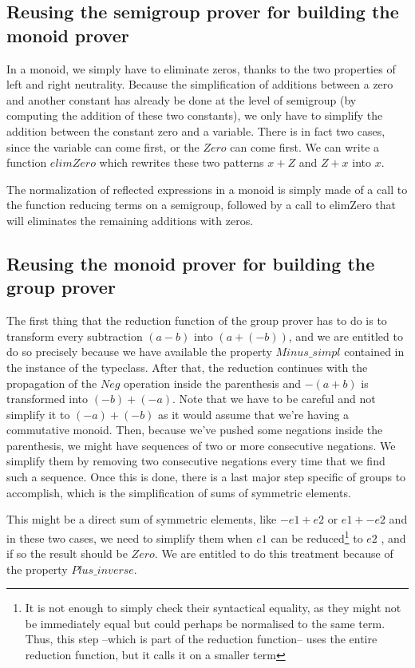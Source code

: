 \subsection {Reusing the semigroup prover for building the monoid prover}

In a monoid, we simply have to eliminate zeros, thanks to the two properties of left and right neutrality. Because the simplification of additions between a zero and another constant has already be done at the level of semigroup (by computing the addition of these two constants), we only have to simplify the addition between the constant zero and a variable. There is in fact two cases, since the variable can come first, or the $Zero$ can come first. We can write a function $elimZero$ which rewrites these two patterns $x+Z$ and $Z+x$ into $x$.


The normalization of reflected expressions in a monoid is simply made of a call to the function reducing terms on a semigroup, followed by a call to elimZero that will eliminates the remaining additions with zeros. 

\subsection {Reusing the monoid prover for building the group prover}

The first thing that the reduction function of the group prover has to do is to transform every subtraction $(a-b)$ into $(a + (-b))$, and we are entitled to do so precisely because we have available the property $Minus\_simpl$ contained in the instance of the typeclass.
After that, the reduction continues with the propagation of the $Neg$ operation inside the parenthesis and $-(a+b)$ is transformed into $(-b) + (-a)$. Note that we have to be careful and not simplify it to $(-a) + (-b)$ as it would assume that we're having a commutative monoid.
Then, because we've pushed some negations inside the parenthesis, we might have sequences of two or more consecutive negations. We simplify them by removing two consecutive negations every time that we find such a sequence. Once this is done, there is a last major step specific of groups to accomplish, which is the simplification of sums of symmetric elements. 

This might be a direct sum of symmetric elements, like $-e1 + e2$ or $e1 + -e2$ and in these two cases, we need to simplify them when $e1$ can be reduced\footnote{It is not enough to simply check their syntactical equality, as they might not be immediately equal but could perhaps be normalised to the same term. Thus, this step --which is part of the reduction function-- uses the entire reduction function, but it calls it on a smaller term} to $e2$ , and if so the result should be $Zero$. We are entitled to do this treatment because of the property $Plus\_inverse$.

